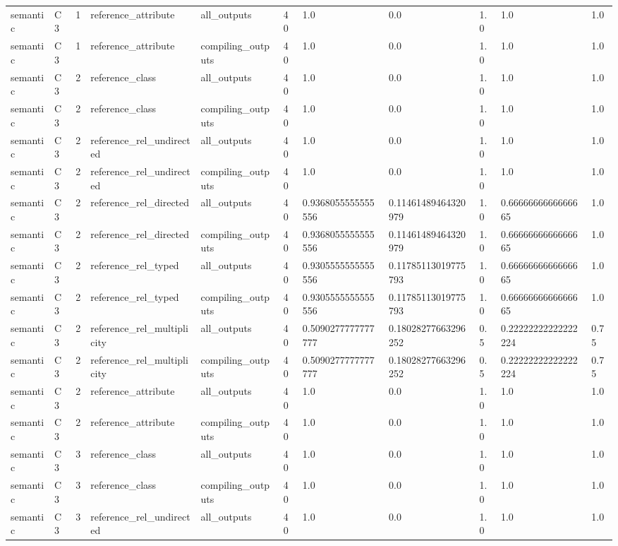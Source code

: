 \begin{tabular}{lllllllllll}
semantic & C3 & 1 & reference\_attribute & all\_outputs & 40 & 1.0 & 0.0 & 1.0 & 1.0 & 1.0 \\
semantic & C3 & 1 & reference\_attribute & compiling\_outputs & 40 & 1.0 & 0.0 & 1.0 & 1.0 & 1.0 \\
semantic & C3 & 2 & reference\_class & all\_outputs & 40 & 1.0 & 0.0 & 1.0 & 1.0 & 1.0 \\
semantic & C3 & 2 & reference\_class & compiling\_outputs & 40 & 1.0 & 0.0 & 1.0 & 1.0 & 1.0 \\
semantic & C3 & 2 & reference\_rel\_undirected & all\_outputs & 40 & 1.0 & 0.0 & 1.0 & 1.0 & 1.0 \\
semantic & C3 & 2 & reference\_rel\_undirected & compiling\_outputs & 40 & 1.0 & 0.0 & 1.0 & 1.0 & 1.0 \\
semantic & C3 & 2 & reference\_rel\_directed & all\_outputs & 40 & 0.9368055555555556 & 0.11461489464320979 & 1.0 & 0.6666666666666665 & 1.0 \\
semantic & C3 & 2 & reference\_rel\_directed & compiling\_outputs & 40 & 0.9368055555555556 & 0.11461489464320979 & 1.0 & 0.6666666666666665 & 1.0 \\
semantic & C3 & 2 & reference\_rel\_typed & all\_outputs & 40 & 0.9305555555555556 & 0.11785113019775793 & 1.0 & 0.6666666666666665 & 1.0 \\
semantic & C3 & 2 & reference\_rel\_typed & compiling\_outputs & 40 & 0.9305555555555556 & 0.11785113019775793 & 1.0 & 0.6666666666666665 & 1.0 \\
semantic & C3 & 2 & reference\_rel\_multiplicity & all\_outputs & 40 & 0.5090277777777777 & 0.18028277663296252 & 0.5 & 0.22222222222222224 & 0.75 \\
semantic & C3 & 2 & reference\_rel\_multiplicity & compiling\_outputs & 40 & 0.5090277777777777 & 0.18028277663296252 & 0.5 & 0.22222222222222224 & 0.75 \\
semantic & C3 & 2 & reference\_attribute & all\_outputs & 40 & 1.0 & 0.0 & 1.0 & 1.0 & 1.0 \\
semantic & C3 & 2 & reference\_attribute & compiling\_outputs & 40 & 1.0 & 0.0 & 1.0 & 1.0 & 1.0 \\
semantic & C3 & 3 & reference\_class & all\_outputs & 40 & 1.0 & 0.0 & 1.0 & 1.0 & 1.0 \\
semantic & C3 & 3 & reference\_class & compiling\_outputs & 40 & 1.0 & 0.0 & 1.0 & 1.0 & 1.0 \\
semantic & C3 & 3 & reference\_rel\_undirected & all\_outputs & 40 & 1.0 & 0.0 & 1.0 & 1.0 & 1.0 \\

\end{tabular}
